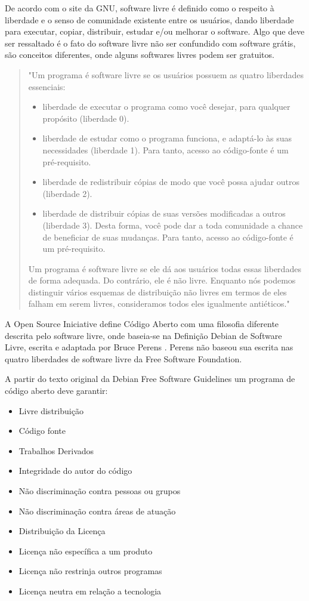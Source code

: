 De acordo com o site da GNU, software livre é definido como o respeito à liberdade e o senso de comunidade existente entre os usuários, dando liberdade para executar, copiar, distribuir, estudar e/ou melhorar o software. Algo que deve ser ressaltado é o fato do software livre não ser confundido com software grátis, são conceitos diferentes, onde alguns softwares livres podem ser gratuitos. \citep{gnu}

\begin{quote}
"Um programa é software livre se os usuários possuem as quatro liberdades essenciais:
\begin{itemize}
    \item liberdade de executar o programa como você desejar, para qualquer propósito (liberdade 0).
    \item liberdade de estudar como o programa funciona, e adaptá-lo às suas necessidades (liberdade 1). Para tanto, acesso ao código-fonte é um pré-requisito.
    \item liberdade de redistribuir cópias de modo que você possa ajudar outros (liberdade 2).
    \item liberdade de distribuir cópias de suas versões modificadas a outros (liberdade 3). Desta forma, você pode dar a toda comunidade a chance de beneficiar de suas mudanças. Para tanto, acesso ao código-fonte é um pré-requisito.
\end{itemize}

Um programa é software livre se ele dá aos usuários todas essas liberdades de forma adequada. Do contrário, ele é não livre. Enquanto nós podemos distinguir vários esquemas de distribuição não livres em termos de eles falham em serem livres, consideramos todos eles igualmente antiéticos." \citep{gnuFS}
    
\end{quote}

A Open Source Iniciative define Código Aberto com uma filosofia diferente descrita pelo software livre, onde baseia-se na Definição Debian de Software Livre, escrita e adaptada por Bruce Perens \citep{openSource}. Perens não baseou sua escrita nas quatro liberdades de software livre da Free Software Foundation.

A partir do texto original da Debian Free Software Guidelines um programa de código aberto deve garantir:
\begin{itemize}
    \item Livre distribuição
    \item Código fonte
    \item Trabalhos Derivados
    \item Integridade do autor do código
    \item Não discriminação contra pessoas ou grupos
    \item Não discriminação contra áreas de atuação
    \item Distribuição da Licença
    \item Licença não específica a um produto
    \item Licença não restrinja outros programas
    \item Licença neutra em relação a tecnologia
    
\end{itemize}

